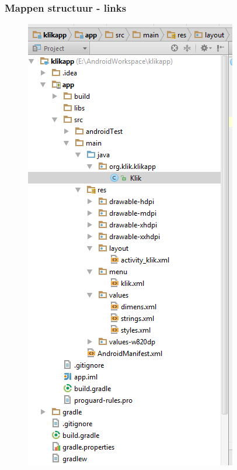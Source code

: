 \documentclass[11pt]{beamer}
\begin{document}
\begin{frame}
\frametitle{Mappen structuur - links}
\begin{figure}
\centering
\includegraphics[height=.9\textheight]{./asinterface2}
\label{fig:asinterface2}
\end{figure}
\end{frame}
\end{document}
